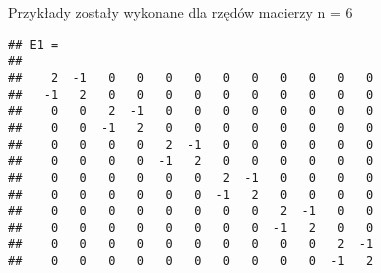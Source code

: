 	Przykłady zostały wykonane dla rzędów macierzy n = 6
		
\begin{samepage}
\begin{Shaded}
\begin{Highlighting}[]
\NormalTok{,}\NormalTok{;}
        
\NormalTok{A=[}\NormalTok{, -}\NormalTok{;-}\NormalTok{,}\NormalTok{];}
\NormalTok{B=[}\NormalTok{,-}\NormalTok{;}\NormalTok{,}\NormalTok{];}
\NormalTok{C=[}\NormalTok{,}\NormalTok{;}\NormalTok{,}\NormalTok{];}
        
\NormalTok{;}
        
\NormalTok{(}
\end{Highlighting}
\end{Shaded}
\end{samepage}
\begin{samepage}
\begin{verbatim}
## E1 =
## 
##    2  -1   0   0   0   0   0   0   0   0   0   0
##   -1   2   0   0   0   0   0   0   0   0   0   0
##    0   0   2  -1   0   0   0   0   0   0   0   0
##    0   0  -1   2   0   0   0   0   0   0   0   0
##    0   0   0   0   2  -1   0   0   0   0   0   0
##    0   0   0   0  -1   2   0   0   0   0   0   0
##    0   0   0   0   0   0   2  -1   0   0   0   0
##    0   0   0   0   0   0  -1   2   0   0   0   0
##    0   0   0   0   0   0   0   0   2  -1   0   0
##    0   0   0   0   0   0   0   0  -1   2   0   0
##    0   0   0   0   0   0   0   0   0   0   2  -1
##    0   0   0   0   0   0   0   0   0   0  -1   2
\end{verbatim}
\end{samepage}
\newpage
\begin{samepage}
\begin{Shaded}
	\begin{Highlighting}[]
\NormalTok{(}
	\end{Highlighting}
\end{Shaded}
\end{samepage}

